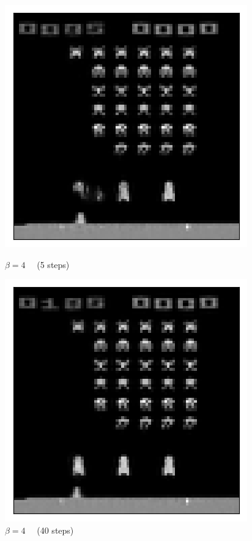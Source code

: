 \begin{figure}[h!]
\begin{multicols}{4}
    \includegraphics[scale=0.4]{figures/results/weighted_average/beta_4_posterior_sample_7.png}
    \caption{$\beta=4\quad$ (5 steps)}
    \includegraphics[scale=0.4]{figures/results/weighted_average/beta_4_posterior_sample_47.png}
    \caption{$\beta=4\quad$ (40 steps)}
\end{multicols}


\end{figure}

